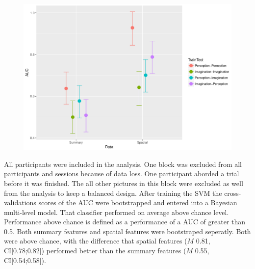 \documentclass[a4paper,man,natbib,floatsintext]{apa6}
\begin{document}
\begin{figure}
\centering
\includegraphics[width=1\textwidth]{FeatureXTrainTest.pdf}
\caption[Training-Test-Condition $\times$ Features]{\label{fig:FeatureXTrainTest} }
\end{figure}
All participants were included in the analysis. One block was excluded from all participants and sessions because of data loss. One participant aborded a trial before it was finished. The all other pictures in this block were excluded as well from the analysis to keep a balanced design.
After training the SVM the cross-validations scores of the AUC were bootstrapped and entered into a Bayesian multi-level model.
That classifier performed on average above chance level. Performance above chance is  defined as a performance of a AUC of greater than 0.5. Both summary features and spatial features were bootstraped seperatly. Both were above chance, with the difference that spatial features ($M$ 0.81, CI[0.78;0.82]) performed better than the summary features ($M$ 0.55, CI[0.54;0.58]). \\
\end{document}
